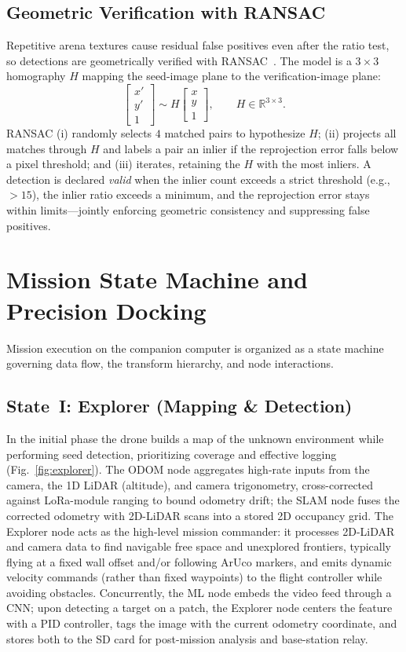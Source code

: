 \documentclass[journal]{IEEEtran}
\begin{document}
\subsection{Geometric Verification with RANSAC}
Repetitive arena textures cause residual false positives even after the
ratio test, so detections are geometrically verified with
RANSAC~\cite{fischler1981ransac}. The model is a $3\times3$ homography
$H$ mapping the seed-image plane to the verification-image plane:
\begin{equation}
\begin{bmatrix} x' \\ y' \\ 1 \end{bmatrix}
\sim
H
\begin{bmatrix} x \\ y \\ 1 \end{bmatrix},
\qquad H \in \mathbb{R}^{3\times3}.
\label{eq:homog}
\end{equation}
RANSAC (i) randomly selects $4$ matched pairs to hypothesize $H$;
(ii) projects all matches through $H$ and labels a pair an inlier if the
reprojection error falls below a pixel threshold; and (iii) iterates,
retaining the $H$ with the most inliers. A detection is declared
\emph{valid} when the inlier count exceeds a strict threshold (e.g., $>15$),
the inlier ratio exceeds a minimum, and the reprojection error stays within
limits---jointly enforcing geometric consistency and suppressing false
positives.

\section{Mission State Machine and Precision Docking}
\label{sec:state}
Mission execution on the companion computer is organized as a state machine
governing data flow, the transform hierarchy, and node interactions.

\subsection{State~I: Explorer (Mapping \& Detection)}
In the initial phase the drone builds a map of the unknown environment while
performing seed detection, prioritizing coverage and effective logging
(Fig.~\ref{fig:explorer}). The ODOM node aggregates high-rate inputs from
the camera, the 1D LiDAR (altitude), and camera trigonometry, cross-corrected
against LoRa-module ranging to bound odometry drift; the SLAM node fuses the
corrected odometry with 2D-LiDAR scans into a stored 2D occupancy grid. The
Explorer node acts as the high-level mission commander: it processes 2D-LiDAR
and camera data to find navigable free space and unexplored frontiers,
typically flying at a fixed wall offset and/or following ArUco markers, and
emits dynamic velocity commands (rather than fixed waypoints) to the flight
controller while avoiding obstacles. Concurrently, the ML node embeds the
video feed through a CNN; upon detecting a target on a patch, the Explorer
node centers the feature with a PID controller, tags the image with the
current odometry coordinate, and stores both to the SD card for
post-mission analysis and base-station relay.
\end{document}
